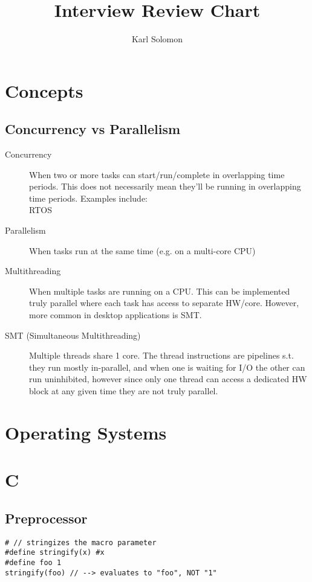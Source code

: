 \documentclass{article}
\begin{document}
\selectfont
\title{Interview Review Chart}
\author{Karl Solomon}
\maketitle
\section{Concepts}
\subsection{Concurrency vs Parallelism}
\begin{description}
	\item[Concurrency]
When two or more tasks can start/run/complete in overlapping time periods. This does not necessarily mean they'll be running in overlapping time periods. Examples include: \\ RTOS
\end{description}
\begin{description}
	\item[Parallelism]
When tasks run at the same time (e.g. on a multi-core CPU) 
\end{description}
\begin{description}
	\item[Multithreading]
When multiple tasks are running on a CPU. This can be implemented truly parallel where each task has access to separate HW/core. However, more common in desktop applications is SMT. 
\end{description}
\begin{description}
	\item[SMT (Simultaneous Multithreading)]
Multiple threads share 1 core. The thread instructions are pipelines s.t. they run mostly in-parallel, and when one is waiting for I/O the other can run uninhibited, however since only one thread can access a dedicated HW block at any given time they are not truly parallel. 
\end{description}
\section{Operating Systems}
\section{C}
\subsection{Preprocessor}
\begin{lstlisting}[style=cpp]
# // stringizes the macro parameter
#define stringify(x) #x
#define foo 1
stringify(foo) // --> evaluates to "foo", NOT "1"
\end{lstlisting}
\end{document}
